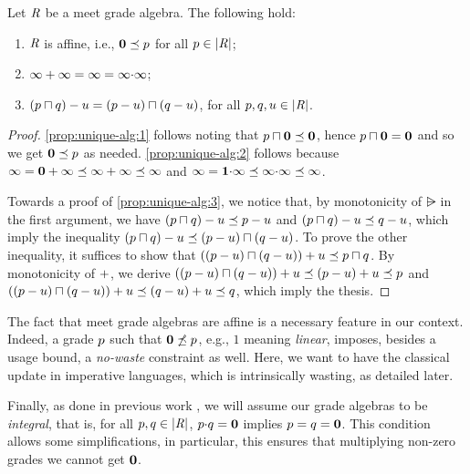 \begin{proposition} \label{prop:unique-alg} 
Let $\mathit{R}$ be a  meet  grade algebra. 
The following hold: 
\begin{enumerate}
\item\label{prop:unique-alg:1} $\mathit{R}$ is affine, i.e., $\mathbf{0}\preceq p$ for all $p\in|\mathit{R}|$; 
\item\label{prop:unique-alg:2} $\infty+\infty = \infty = \infty{\cdot}\infty$; 
\item\label{prop:unique-alg:3} $(p\sqcap q)-u = (p-u)\sqcap(q-u)$, for all $p,q,u\in|\mathit{R}|$. 
\end{enumerate} 
\end{proposition}
\begin{proof}
\cref{prop:unique-alg:1}  follows noting that 
$p\sqcap\mathbf{0}\preceq\mathbf{0}$, hence $p\sqcap\mathbf{0} = \mathbf{0}$ and so we get
$\mathbf{0} \preceq p$ as needed. \cref{prop:unique-alg:2}  follows because 
$\infty = \mathbf{0}+\infty \preceq \infty+\infty \preceq \infty$ and 
$\infty = \mathbf{1}{\cdot}\infty \preceq \infty{\cdot}\infty \preceq \infty$. 

Towards a proof of \cref{prop:unique-alg:3}, 
we notice that, by monotonicity of $\rsub$ in the first argument, we have 
$(p\sqcap q)-u\preceq p-u$ and 
$(p\sqcap q)-u\preceq q-u$, which imply the inequality 
$(p\sqcap q)-u\preceq(p-u)\sqcap(q-u)$. 
To prove the other inequality, it suffices to show that 
$((p-u)\sqcap(q-u))+u\preceq p\sqcap q$. 
By monotonicity of $+$, we derive 
$((p-u)\sqcap(q-u))+u\preceq(p-u)+u\preceq p$ and 
$((p-u)\sqcap(q-u))+u\preceq(q-u)+u\preceq q$, which imply the thesis. 
\end{proof}

The fact that  meet  grade algebras are affine is a necessary feature in our context. 
Indeed, a grade $p$ such that $\mathbf{0}\not\preceq p$, e.g., $1$ meaning \emph{linear}, imposes, besides a usage bound, a \emph{no-waste} constraint as well.  Here, we want to have the classical update in imperative languages, which is intrinsically wasting, as detailed later.

Finally, as done in previous work \cite{BianchiniDGZ23oopsla}, 
we will assume our grade algebras to be \emph{integral}, that is, 
for all $p,q\in|\mathit{R}|$, $p{\cdot}q = \mathbf{0}$ implies $p=q = \mathbf{0}$. 
This condition allows some simplifications, in particular, this ensures that multiplying non-zero grades we cannot get $\mathbf{0}$. 

